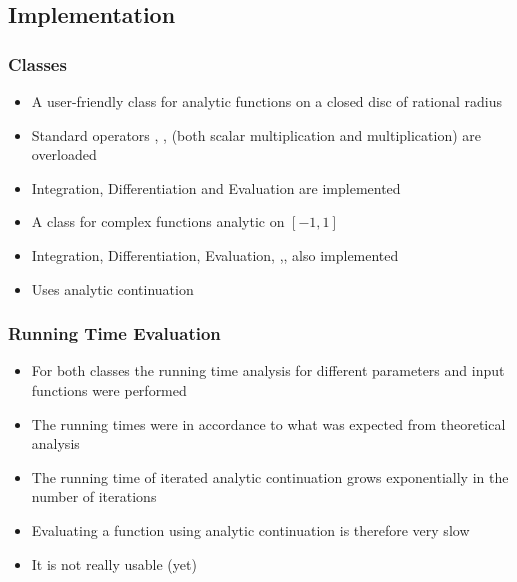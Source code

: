 
\subsection{Implementation}
\begin{frame}[<+->]
\frametitle{Classes}
\begin{itemize}
\item A user-friendly class for analytic functions on a closed disc of rational radius
\item Standard operators \code{+}, \code{-}, \code{*} (both scalar multiplication and multiplication) are overloaded
\item Integration, Differentiation and Evaluation are implemented
\end{itemize}
\pause
{}
\begin{itemize}
\item A class for complex functions analytic on $[-1,1]$
\item Integration, Differentiation, Evaluation, \code{+},\code{-},  \code{*} also implemented  
\item Uses analytic continuation
\end{itemize}
\end{frame}
\begin{frame}[<+->]
\frametitle{Running Time Evaluation}
\begin{itemize}
	\item For both classes the running time analysis for different parameters and input functions were performed
	\item The running times were in accordance to what was expected from theoretical analysis
	\item The running time of iterated analytic continuation grows exponentially in the number of iterations 
	\item Evaluating a function using analytic continuation is therefore very slow
	\item It is not really usable (yet)
\end{itemize}
\end{frame}


